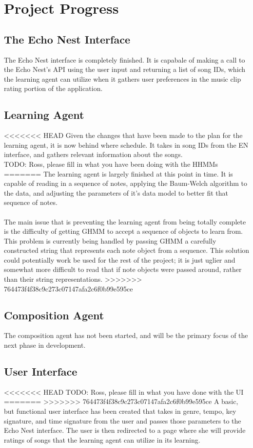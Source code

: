 \documentclass{article}
\begin{document}
\section{Project Progress}
\subsection{The Echo Nest Interface}
The Echo Nest interface is completely finished.  It is capabale of making a call to the Echo Nest's API using the 
user input and returning a list of song IDs, which the learning agent can utilize when it gathers user preferences
in the music clip rating portion of the application.

\subsection{Learning Agent}
<<<<<<< HEAD
Given the changes that have been made to the plan for the learning agent, it is now behind where schedule.
It takes in song IDs from the EN interface, and gathers relevant information about the songs.
\\
\Large{TODO: Ross, please fill in what you have been doing with the HHMMs}
=======
The learning agent is largely finished at this point in time. It is capable of reading in a sequence
of notes, applying the Baum-Welch algorithm to the data, and adjusting the parameters of it's data
model to better fit that sequence of notes.\\
\\
The main issue that is preventing the learning agent from being totally complete is the difficulty
of getting GHMM to accept a sequence of objects to learn from. This problem is currently being
handled by passing GHMM a carefully constructed string that represents each note object from a 
sequence. This solution could potentially work be used for the rest of the project; it is just
uglier and somewhat more difficult to read that if note objects were passed around, rather than
their string representations.
>>>>>>> 764473f4f38c9c273c07147afa2c6f0b99e595ce

\subsection{Composition Agent}
The composition agent has not been started, and will be the primary focus of the next phase in development.

\subsection{User Interface}
<<<<<<< HEAD
\Large{TODO: Ross, please fill in what you have done with the UI}
=======
>>>>>>> 764473f4f38c9c273c07147afa2c6f0b99e595ce
A basic, but functional user interface has been created that takes in genre, tempo, key signature, and time
signature from the user and passes those parameters to the Echo Nest interface. The user is then redirected
to a page where she will provide ratings of songs that the learning agent can utilize in its learning.
\end{document}
